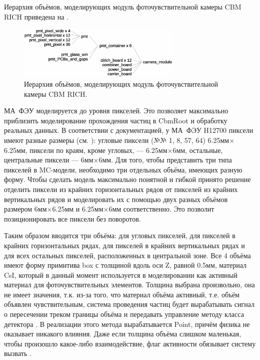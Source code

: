 Иерархия объёмов, моделирующих модуль фоточувствительной камеры CBM RICH приведена на .

\begin{figure}[H]
\centering
\includegraphics[width=0.7\textwidth]{pictures/Module_geoStructure.eps}
\caption{Иерархия объёмов, моделирующих модуль фоточувствительной камеры CBM RICH.}
\label{fig:Module_geoStructure}
\end{figure}

МА~ФЭУ моделируется до уровня пикселей. Это позволяет максимально приблизить моделирование прохождения частиц в CbmRoot и обработку реальных данных. В соответствии с документацией, у МА~ФЭУ H12700 пиксели имеют разные размеры (см. ): угловые пиксели (№№ 1, 8, 57, 64) 6.25мм$\times$6.25мм, пиксели по краям, кроме угловых, --- 6.25мм$\times$6мм, остальные, центральные пиксели --- 6мм$\times$6мм. Для того, чтобы представить три типа пикселей в MC-модели, необходимо три отдельных объёма, имеющих разную форму. Чтобы сделать модель максимально понятной и гибкой принято решение отделить пиксели из крайних горизонтальных рядов от пикселей из крайних вертикальных рядов и моделировать их с помощью двух разных объёмов размером 6мм$\times$6.25мм и 6.25мм$\times$6мм соответственно. Это позволит позиционировать все пиксели без поворотов.

Таким образом вводится три объёма:  для угловых пикселей,  для пикселей в крайних горизонтальных рядах,  для пикселей в крайних вертикальных рядах и  для всех остальных пикселей, расположенных в центральной зоне. Все 4 объёма имеют форму примитива box с толщиной вдоль оси Z, равной 0.5мм, материал CsI, который в данный момент используется в моделировании как активный материал для фоточувствительных элементов. Толщина выбрана произвольно, она не имеет значения, т.к. из-за того, что материал объёма активный, т.е. объём объявлен чувствительным, система проведения частиц будет вырабатывать сигнал о пересечении треком границы объёма и передавать управление методу  класса детектора . В реализации этого метода вырабатывается Point, причём физика не оказывает никакого влияния. Даже если толщина объёма слишком маленькая, чтобы произошло какое-либо взаимодействие, флаг активности обязывает систему вызвать .

